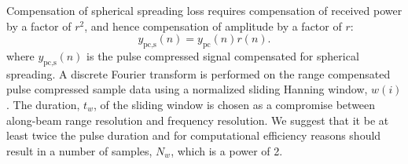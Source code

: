 \documentclass[preprint,12pt,TurnOnLineNumbers]{JASAnew}
\newcommand{\samplesymt}{n}
\newcommand{\genidxsym}{i}
\newcommand{\ypc}{y_{\textrm{pc}}}
\newcommand{\ypcspread}{y_{\textrm{pc,s}}}
\newcommand{\hannw}{w}
\newcommand{\nw}{N_{\hannw}}
\newcommand{\tslide}{t_w}
\newcommand{\range}{r}
\begin{document}
Compensation of spherical spreading loss requires compensation of received power by a factor of $r^2$, and hence compensation of amplitude by a factor of $\range$:
%
\begin{equation}
\label{eq:spreadcomp}
\ypcspread(\samplesymt) = \ypc(\samplesymt)\range(\samplesymt).
\end{equation}
%
where $\ypcspread(\samplesymt)$ is the pulse compressed signal compensated for spherical spreading. A discrete Fourier transform is performed on the range compensated pulse compressed sample data using a normalized sliding Hanning window, $\hannw(\genidxsym)$. The duration, $\tslide$, of the sliding window is chosen as a compromise between along-beam range resolution and frequency resolution. We suggest that it be at least twice the pulse duration and for computational efficiency reasons should result in a number of samples, $\nw$, which is a power of 2.
\end{document}
